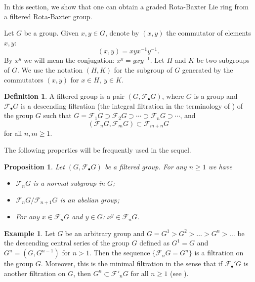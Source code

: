 \documentclass[12pt]{amsart}
\newtheorem{pro}[thm]{Proposition}
\theoremstyle{definition}   %
\newtheorem{defi}[thm]{Definition}
\newtheorem{ex}[thm]{Example}
\newcommand{\huaF}{\mathcal{F}}
\begin{document}
In this section, we show that one can obtain a graded Rota-Baxter Lie ring from a filtered Rota-Baxter group.

Let $G$ be a group. Given $x,y\in G$, denote by $(x,y)$ the commutator of elements $x,y$:
$$
(x,y)=xyx^{-1}y^{-1}.
$$
By $x^y$ we will mean the conjugation: $x^y=yxy^{-1}$. Let $H$  and $K$ be two subgroups of $G$. We use the notation $(H,K)$  for the subgroup of $G$ generated by  the commutators $(x,y)$ for $x\in H,~y\in K$.

\begin{defi}
    A filtered group is a pair $(G,\huaF_{\bullet}G)$, where $G$ is a group and $\huaF_{\bullet}G$ is a descending filtration (the integral filtration in the terminology of \cite{Ser}) of the group $G$ such that $G=\huaF_1G\supset\huaF_2G\supset\cdots\supset\huaF_n G\supset\cdots$, and
    \begin{equation}\label{ugr}
        (\huaF_nG,\huaF_mG)\subset \huaF_{m+n}G
    \end{equation}
    for all $n,m\geq 1$.
\end{defi}


The following properties will be frequently used in the sequel.

\begin{pro}\label{Ser}\cite{Ser} Let $(G,\huaF_{\bullet}G)$ be a filtered group. For any $n\geq 1$ we have
    \begin{itemize}
\item[{\rm(i)}] $\huaF_n G$ is a normal subgroup in $G$;
\item[{\rm(ii)}] $\huaF_nG/\huaF_{n+1}G$ is an abelian group;
\item[{\rm(iii)}] For any $x\in \huaF_n G$ and $y\in G$: $x^y\in \huaF_{n}G$.
\end{itemize}
\end{pro}

\begin{ex}\label{exgrfilt}
   Let $G$ be an arbitrary group and $G=G^1>G^2>\ldots >G^n>\ldots$ be the descending central series of the group $G$ defined as $G^1=G$ and $G^n=(G,G^{n-1})$ for $n>1$. Then the sequence $\{\huaF_nG=G^n\}$ is a filtration on the group $G$. Moreover, this is the minimal filtration in the sense that if $\huaF_{\bullet}'G$ is another filtration on $G$, then $G^n\subset \huaF'_nG$ for all $n\geq 1$ (see \cite{Ser}).
\end{ex}
\end{document}
